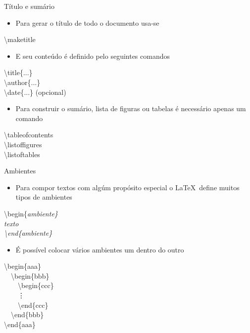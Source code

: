 \begin{frame}{Título e sumário}
    \begin{itemize}
    \item Para gerar o título de todo o documento usa-se
    \end{itemize}

   \alert{\textbackslash maketitle}

    \begin{itemize}
    \item E seu conteúdo é definido pelo seguintes comandos
    \end{itemize}

    \alert{\textbackslash title\{...\}} \\
    \alert{\textbackslash author\{...\}} \\
    \alert{\textbackslash date\{...\}} {\small (opcional)}

    \begin{itemize}
    \item Para construir o sumário, lista de figuras ou tabelas é necessário apenas um comando
    \end{itemize}
    
    \alert{\textbackslash tableofcontents \\
           \textbackslash listoffigures \\
           \textbackslash listoftables
        }

\end{frame}

\begin{frame}{Ambientes}
    \begin{itemize}
    \item Para compor textos com algúm propósito especial o \LaTeX\ define muitos tipos de ambientes
    \end{itemize}

    \alert{\textbackslash begin\{\it ambiente\} \\
           \textit{texto} \\
           \textbackslash end\{\it ambiente\}}

    \begin{itemize}
    \item É possível colocar vários ambientes um dentro do outro
    \end{itemize}

    \alert{\small
    \textbackslash begin\{aaa\} \\
    \ \ \textbackslash begin\{bbb\} \\
    \ \ \ \ \textbackslash begin\{ccc\} \\
    \ \ \ \ \vdots \\
    \ \ \ \ \textbackslash end\{ccc\} \\
    \ \ \textbackslash end\{bbb\} \\
    \textbackslash end\{aaa\}
    }
\end{frame}

